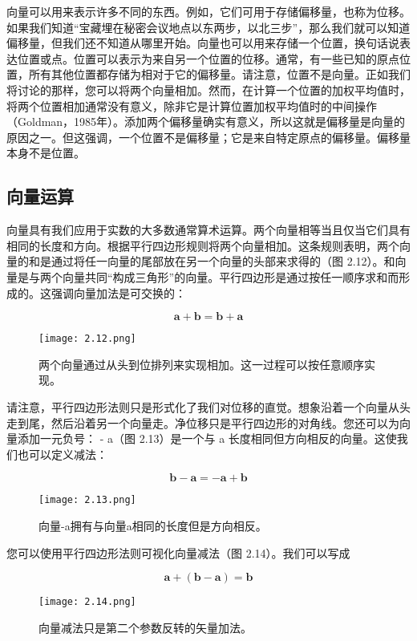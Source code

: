 \documentclass[lang=cn,12pt]{elegantbook}
\begin{document}
向量可以用来表示许多不同的东西。例如，它们可用于存储偏移量，也称为位移。如果我们知道“宝藏埋在秘密会议地点以东两步，以北三步”，那么我们就可以知道偏移量，但我们还不知道从哪里开始。向量也可以用来存储一个位置，换句话说表达位置或点。位置可以表示为来自另一个位置的位移。通常，有一些已知的原点位置，所有其他位置都存储为相对于它的偏移量。请注意，位置不是向量。正如我们将讨论的那样，您可以将两个向量相加。然而，在计算一个位置的加权平均值时，将两个位置相加通常没有意义，除非它是计算位置加权平均值时的中间操作（Goldman，1985年）。添加两个偏移量确实有意义，所以这就是偏移量是向量的原因之一。但这强调，一个位置不是偏移量；它是来自特定原点的偏移量。偏移量本身不是位置。

\subsection{向量运算}

向量具有我们应用于实数的大多数通常算术运算。两个向量相等当且仅当它们具有相同的长度和方向。根据平行四边形规则将两个向量相加。这条规则表明，两个向量的和是通过将任一向量的尾部放在另一个向量的头部来求得的（图 2.12）。和向量是与两个向量共同“构成三角形”的向量。平行四边形是通过按任一顺序求和而形成的。这强调向量加法是可交换的：

$$
\mathbf{a}+\mathbf{b}=\mathbf{b}+\mathbf{a}
$$

\begin{figure}[htbp]
\centering
\texttt{[image: 2.12.png]}
\caption{两个向量通过从头到位排列来实现相加。这一过程可以按任意顺序实现。}
\end{figure}

请注意，平行四边形法则只是形式化了我们对位移的直觉。想象沿着一个向量从头走到尾，然后沿着另一个向量走。净位移只是平行四边形的对角线。您还可以为向量添加一元负号： - a（图 2.13）是一个与 a 长度相同但方向相反的向量。这使我们也可以定义减法：

$$
\mathbf{b}-\mathbf{a}=-\mathbf{a}+\mathbf{b}
$$

\begin{figure}[htbp]
\centering
\texttt{[image: 2.13.png]}
\caption{向量-a拥有与向量a相同的长度但是方向相反。}
\end{figure}

您可以使用平行四边形法则可视化向量减法（图 2.14）。我们可以写成

$$
\mathbf{a}+(\mathbf{b}-\mathbf{a})=\mathbf{b}
$$

\begin{figure}[htbp]
\centering
\texttt{[image: 2.14.png]}
\caption{向量减法只是第二个参数反转的矢量加法。}
\end{figure}
\end{document}
